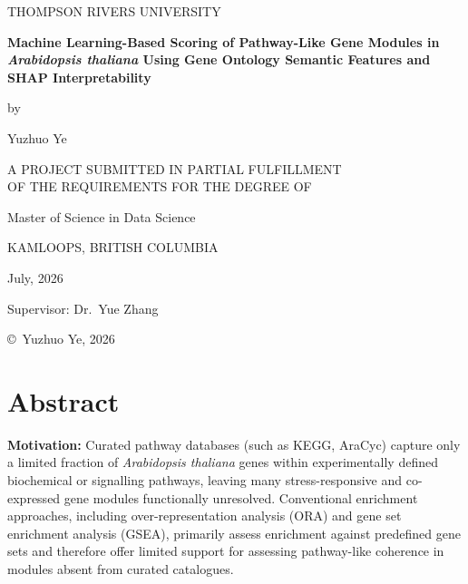 \documentclass[12pt,letterpaper,oneside,openany]{book}
\begin{document}
\frontmatter

\begin{titlepage}
\thispagestyle{empty}
\centering
\vspace*{0.5in}
{\large THOMPSON RIVERS UNIVERSITY\par}
\vspace{1.2in}
{\LARGE\bfseries Machine Learning-Based Scoring of Pathway-Like Gene Modules in
\textit{Arabidopsis thaliana} Using Gene Ontology Semantic Features
and SHAP Interpretability\par}
\vspace{0.8in}
{\large by\par}
\vspace{0.2in}
{\large Yuzhuo Ye\par}
\vspace{1.0in}
{\large A PROJECT SUBMITTED IN PARTIAL FULFILLMENT\\[3pt]
OF THE REQUIREMENTS FOR THE DEGREE OF\par}
\vspace{0.4in}
{\large Master of Science in Data Science\par}
\vspace{0.5in}
{\large KAMLOOPS, BRITISH COLUMBIA\par}
\vspace{0.4in}
{\large July, 2026\par}
\vspace{0.5in}
{\large Supervisor: Dr.~Yue Zhang\par}
\vfill
{\large \copyright\ Yuzhuo Ye, 2026\par}
\end{titlepage}

\chapter*{Abstract}
\noindent
\textbf{Motivation:}
Curated pathway databases (such as KEGG, AraCyc) capture only a limited fraction of \textit{Arabidopsis thaliana} genes within experimentally defined biochemical or signalling pathways, leaving many stress-responsive and co-expressed gene modules functionally unresolved. Conventional enrichment approaches, including over-representation analysis (ORA) and gene set enrichment analysis (GSEA), primarily assess enrichment against predefined gene sets and therefore offer limited support for assessing pathway-like coherence in modules absent from curated catalogues.
\end{document}
